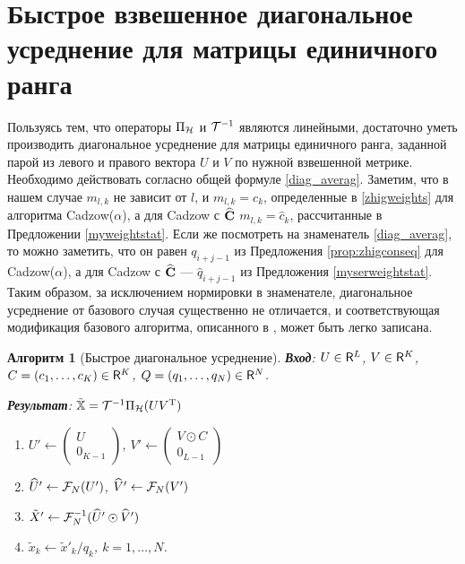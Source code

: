 \documentclass[12pt, specialist, subf,href,colorlinks=true,substylefile = spbu.rtx]{disser}
\newtheorem{algorithm}{Алгоритм}
\theoremstyle{remark}
\theoremstyle{definition}
\begin{document}
\section{Быстрое взвешенное диагональное усреднение для матрицы единичного ранга}
Пользуясь тем, что операторы $\Pi_{\mathcal{H}}$ и $\mathcal{T}^{-1}$ являются линейными, достаточно уметь производить диагональное усреднение для матрицы единичного ранга, заданной парой из левого и правого вектора $U$ и $V$ по нужной взвешенной метрике. Необходимо действовать согласно общей формуле \eqref{diag_averag}. Заметим, что в нашем случае $m_{l,k}$ не зависит от $l$, и $m_{l,k} = c_k$, определенные в \eqref{zhigweights} для алгоритма Cadzow($\alpha$), а для Cadzow с $\widehat {\mathbf{C}}$ $m_{l,k} = \hat c_k$, рассчитанные в Предложении \ref{myweightstat}. Если же посмотреть на знаменатель \eqref{diag_averag}, то можно заметить, что он равен $q_{i+j-1}$ из Предложения \ref{prop:zhigconseq} для Cadzow($\alpha$), а для Cadzow с $\widehat {\mathbf{C}}$ --- $\hat q_{i+j-1}$ из Предложения \ref{myserweightstat}. Таким образом, за исключением нормировки в знаменателе, диагональное усреднение от базового случая существенно не отличается, и соответствующая модификация базового алгоритма, описанного в \cite{Golyandina2013a}, может быть легко записана.
\begin{algorithm}[Быстрое диагональное усреднение]
	\textbf{Вход}: $U \in \mathsf{R}^L$, $V \in \mathsf{R}^K$, $C = (c_1, \ldots, c_K) \in \mathsf{R}^K$, $Q = (q_1, \ldots, q_N) \in \mathsf{R}^N$.
	
	\textbf{Результат}:
	$\tilde {\mathbb{X}} = \mathcal{T}^{-1}\Pi_{\mathcal{H}}(U V^{\mathrm{T}})$
	
	\begin{enumerate}
		\item
		$U' \leftarrow \begin{pmatrix}
		U \\ 
		0_{K-1}
		\end{pmatrix} $, $V' \leftarrow \begin{pmatrix}
		V \odot C \\ 
		0_{L-1}
		\end{pmatrix} $
		\item
		$\widehat U' \leftarrow \mathcal{F}_N(U')$, $\widehat V' \leftarrow \mathcal{F}_N(V')$
		\item
		$\tilde X' \leftarrow \mathcal{F}^{-1}_N (\widehat U' \odot \widehat V')$
		\item
		$\tilde x_k \leftarrow \tilde x'_k/q_k$, $k = 1, \ldots, N$.
	\end{enumerate}
\end{algorithm}
\end{document}
